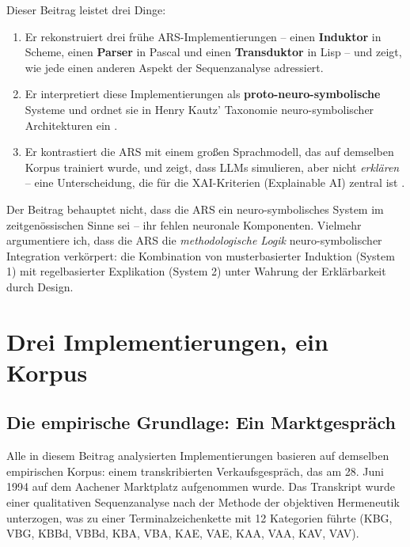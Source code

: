 \documentclass[12pt,a4paper]{article}
\begin{document}
Dieser Beitrag leistet drei Dinge:

\begin{enumerate}
    \item Er rekonstruiert drei frühe ARS-Implementierungen – einen 
    \textbf{Induktor} in Scheme, einen \textbf{Parser} in Pascal und einen 
    \textbf{Transduktor} in Lisp – und zeigt, wie jede einen anderen Aspekt 
    der Sequenzanalyse adressiert.
    
    \item Er interpretiert diese Implementierungen als \textbf{proto-neuro-symbolische} 
    Systeme und ordnet sie in Henry Kautz' Taxonomie neuro-symbolischer 
    Architekturen ein \citep{kautz2020third}.
    
    \item Er kontrastiert die ARS mit einem großen Sprachmodell, das auf demselben 
    Korpus trainiert wurde, und zeigt, dass LLMs simulieren, aber nicht 
    \textit{erklären} – eine Unterscheidung, die für die XAI-Kriterien 
    (Explainable AI) zentral ist \citep{ortigossa2024xai}.
\end{enumerate}

Der Beitrag behauptet nicht, dass die ARS ein neuro-symbolisches System im 
zeitgenössischen Sinne sei – ihr fehlen neuronale Komponenten. Vielmehr 
argumentiere ich, dass die ARS die \textit{methodologische Logik} neuro-symbolischer 
Integration verkörpert: die Kombination von musterbasierter Induktion (System 1) 
mit regelbasierter Explikation (System 2) unter Wahrung der Erklärbarkeit durch 
Design.

\section{Drei Implementierungen, ein Korpus}

\subsection{Die empirische Grundlage: Ein Marktgespräch}

Alle in diesem Beitrag analysierten Implementierungen basieren auf demselben 
empirischen Korpus: einem transkribierten Verkaufsgespräch, das am 28. Juni 1994 
auf dem Aachener Marktplatz aufgenommen wurde. Das Transkript wurde einer 
qualitativen Sequenzanalyse nach der Methode der objektiven Hermeneutik 
\citep{oevermann1979methodology} unterzogen, was zu einer Terminalzeichenkette 
mit 12 Kategorien führte (KBG, VBG, KBBd, VBBd, KBA, VBA, KAE, VAE, KAA, VAA, 
KAV, VAV).
\end{document}
